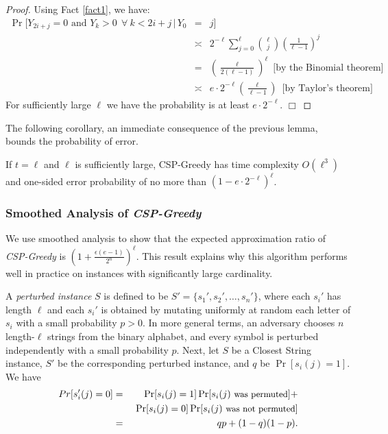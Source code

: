 \begin{proof}
Using Fact \ref{fact1}, we have: 
\begin{eqnarray*}
\Pr[Y_{2i+j} = 0 \mbox{ and } Y_k > 0 \:\: \forall \: k < 2i +j \, |  \, Y_0 \!\!&=&\!\! j ] \\
 &\asymp& 2^{-\ell} \sum_{j = 0}^{\ell}  {\ell \choose j} \left( \frac{1}{\ell - 1}\right)^{j} \\
&=& \left( \frac{\ell}{2(\ell - 1)}\right)^{\ell} \, \mbox{ [by the Binomial theorem]} \\
&\asymp & e \cdot 2^{-\ell}  \left( \frac{\ell}{\ell - 1}\right)  \, \mbox{ [by Taylor's theorem]}  
\end{eqnarray*}
For sufficiently large $\ell$ we have the probability is at least $e \cdot 2^{-\ell}$. \hfill $\Box$ \end{proof}
The following corollary, an immediate consequence of the previous lemma, bounds the probability of error. 
 
\begin{corollary} \label{cor_1} If $t = \ell$ and $\ell$ is sufficiently large, CSP-Greedy has time complexity $O(\ell^3)$ and one-sided error probability of no more than $\left( 1 - e \cdot 2^{-\ell} \right)^{\ell}$. \end{corollary}

\subsubsection{Smoothed Analysis of {\em CSP-Greedy}}

We use smoothed analysis to show that the expected approximation ratio of {\em CSP-Greedy} is $\left(1 + \frac{\epsilon (e - 1)}{2^n}\right)^{\ell}$.  This result explains why this algorithm performs well in practice on instances with significantly large cardinality. 

A {\em perturbed instance} $S$ is defined to be $S' = \{s_1', s_2', \ldots, s_n'\}$, where each $s_i'$ has length $\ell$ and each $s_i'$ is obtained by mutating uniformly at random  each letter of $s_i$ with a small probability $p > 0$.  In more general terms, an adversary chooses $n$ length-$\ell$ strings from the binary alphabet, and every symbol is perturbed independently with a small probability $p$.  Next, let $S$ be a {\sc Closest String} instance, $S'$ be the corresponding perturbed instance, and $q$ be $\Pr[s_i(j) = 1]$. We have 
\begin{eqnarray*}
Pr[s_i'(j)  = 0] & = & \Pr[s_i(j) = 1] \Pr[s_i(j) \mbox{ \small{was permuted}}] + \\
								&~&~  \Pr[s_i(j) = 0]  \Pr[s_i(j) \mbox{ \small{was not permuted}}]\\
					  & = & qp + (1 - q) (1 - p).
\end{eqnarray*}					 

